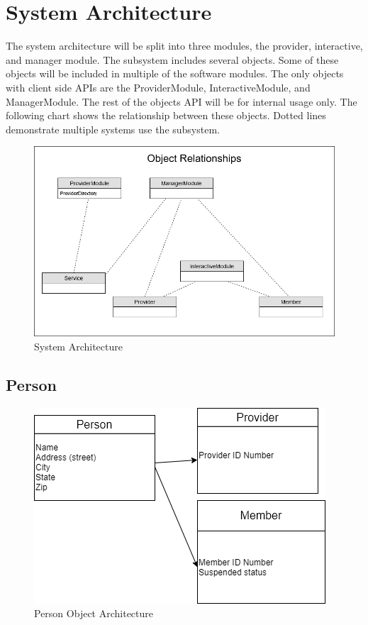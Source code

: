 \documentclass{article}
\begin{document}
\section{System Architecture}
The system architecture will be split into three modules, the provider, interactive, and manager module. The subsystem includes several objects. Some of these objects will be included in multiple of the software modules. The only objects with client side APIs are the ProviderModule, InteractiveModule, and ManagerModule. The rest of the objects API will be for internal usage only. The following chart shows the relationship between these objects. Dotted lines demonstrate multiple systems use the subsystem.

  \begin{figure}[h!]
	\centering
	\includegraphics[width=0.8\linewidth]{architecture.png}
	\caption[System Architecture]{System Architecture}
	\label{fig:P1compileP0-1}
  \end{figure}

\pagebreak

\subsection{Person}
  \begin{figure}[h!]
	\centering
	\includegraphics[width=0.5\linewidth]{person.png}
	\caption[Person Object Architecture]{Person Object Architecture}
	\label{fig:P1compileP0-1}
  \end{figure}
\end{document}
